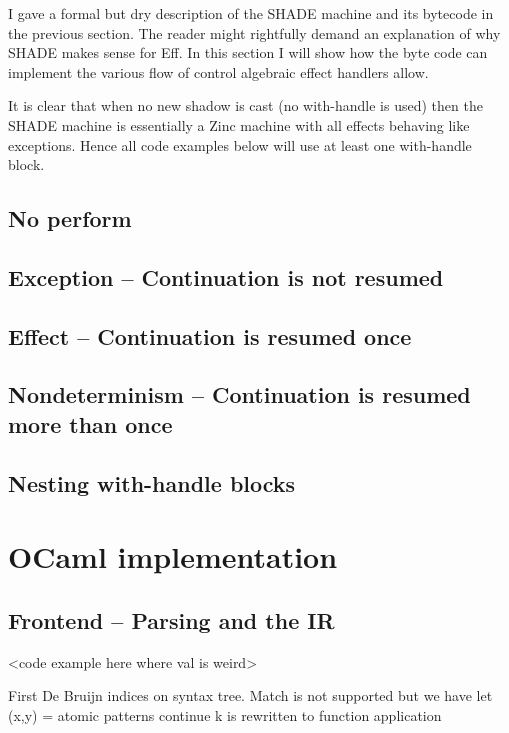 \documentclass[class=article, crop=false]{standalone}
\begin{document}
I gave a formal but dry description of the SHADE machine and its bytecode in the previous section.
The reader might rightfully demand an explanation of why SHADE makes sense for Eff. In this section
I will show how the byte code can implement the various flow of control algebraic effect handlers allow.

It is clear that when no new shadow is cast (no with-handle is used) then the SHADE machine is essentially a Zinc machine with
all effects behaving like exceptions. Hence all code examples below will use at least one with-handle block.

\subsection{No perform}

\subsection{Exception -- Continuation is not resumed}

\subsection{Effect -- Continuation is resumed once}

\subsection{Nondeterminism -- Continuation is resumed more than once}

\subsection{Nesting with-handle blocks}


\section{OCaml implementation}

\subsection{Frontend -- Parsing and the IR}

<code example here where val is weird>

First De Bruijn indices on syntax tree.
Match is not supported but we have let (x,y) =
atomic patterns
continue k is rewritten to function application
\end{document}
